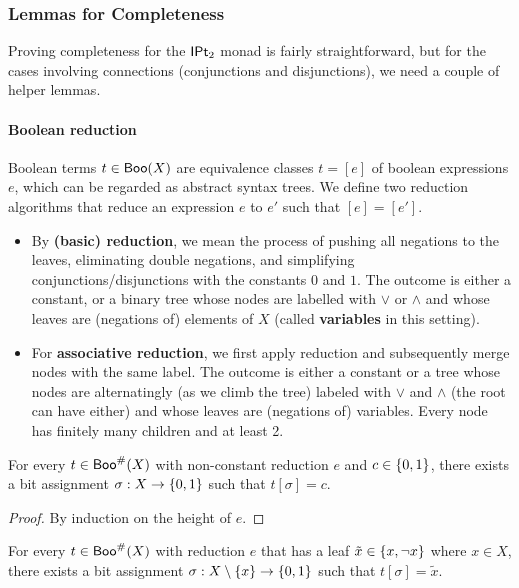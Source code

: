 \documentclass[a4paper]{article}
\begin{document}
\subsubsection{Lemmas for Completeness}
Proving completeness for the ${\mathsf{IPt}_2}$ monad is fairly straightforward,
but for the cases involving connections (conjunctions and disjunctions), we need a couple of helper lemmas.

\paragraph{Boolean reduction}
\begin{definition} \label{def:reduction}
	Boolean terms $t \in \mathsf{Boo}(X)$ are equivalence classes $t = [e]$ of boolean expressions $e$, which can be regarded as abstract syntax trees.
	We define two reduction algorithms that reduce an expression $e$ to $e'$ such that $[e] = [e']$.
	\begin{itemize}
		\item By \textbf{(basic) reduction}, we mean the process of pushing all negations to the leaves, eliminating double negations, and simplifying conjunctions/disjunctions with the constants $0$ and $1$.
		The outcome is either a constant, or a binary tree whose nodes are labelled with $\vee$ or $\wedge$ and whose leaves are (negations of) elements of $X$ (called \textbf{variables} in this setting).
		\item For \textbf{associative reduction}, we first apply reduction and subsequently merge nodes with the same label.
		The outcome is either a constant or a tree whose nodes are alternatingly (as we climb the tree) labeled with $\vee$ and $\wedge$ (the root can have either) and whose leaves are (negations of) variables.
		Every node has finitely many children and at least 2.
	\end{itemize}
\end{definition}
\begin{lemma} \label{thm:boolexp-to-const-assignment}
	For every $t \in \mathsf{Boo}^\#(X)$ with non-constant reduction $e$ and $c \in \mathopen{}\left\{ 0, 1 \right\}\mathclose{}$, there exists a bit assignment $\sigma : X \to \mathopen{}\left\{ 0, 1 \right\}\mathclose{}$ such that $t[\sigma] = c$.
\end{lemma}
\begin{proof}
	By induction on the height of $e$.
\end{proof}
\begin{lemma} \label{thm:boolexp-to-var-assignment}
	For every $t \in \mathsf{Boo}^\#(X)$ with reduction $e$ that has a leaf $\tilde x \in \mathopen{}\left\{ x,\lnot x \right\}\mathclose{}$ where $x \in X$, there exists a bit assignment $\sigma : X \setminus \mathopen{}\left\{ x \right\}\mathclose{} \to \mathopen{}\left\{ 0, 1 \right\}\mathclose{}$ such that $t[\sigma] = \tilde x$.
\end{lemma}
\end{document}
